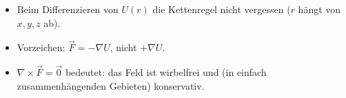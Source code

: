\begin{achtung}
\begin{itemize}
  \item Beim Differenzieren von $U(r)$ die Kettenregel nicht vergessen
        ($r$ hängt von $x,y,z$ ab).
  \item Vorzeichen: $\vec F=-\nabla U$, nicht $+\nabla U$.
  \item $\nabla\times\vec F=\vec 0$ bedeutet: das Feld ist wirbelfrei und
        (in einfach zusammenhängenden Gebieten) konservativ.
\end{itemize}
\end{achtung}
